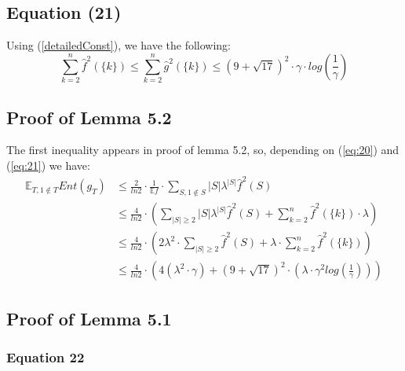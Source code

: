 \documentclass{article}
\begin{document}
		\subsection{Equation (21)}
			Using (\ref{detailedConst}), we have the following:
			\begin{equation} \label{eq:21}
				\sum_{k=2}^n \hat{f}^2 \left( \{k\} \right) 
				\leq \sum_{k=2}^n \hat{g}^2 \left( \{k\} \right) 
				\leq \left( 9 + \sqrt{17} \right) ^ 2 \cdot \gamma \cdot log \left( \frac{1}{\gamma} \right)
			\end{equation}
	
		\subsection{Proof of Lemma 5.2}
			The first inequality appears in proof of lemma 5.2, so, depending on (\ref{eq:20}) and (\ref{eq:21}) we have:
			\begin{equation} \label{lemma5:2}\begin{aligned}
				\mathbb{E}_{T, 1 \notin T} Ent(g_T)
				& \leq \frac{2}{ln2} \cdot \frac{1}{\mathbb{E} f} \cdot \sum_{S, 1 \notin S} |S| \lambda^{|S|} \hat{f}^2(S) \\
				& \leq \frac{4}{ln2} \cdot \left( \sum_{|S| \geq 2} |S| \lambda^{|S|} \hat{f}^2(S) + \sum_{k=2}^n \hat{f}^2 \left( \{k\} \right) \cdot \lambda \right) \\
				& \leq \frac{4}{ln2}  \cdot \left( 2 \lambda^2 \cdot \sum_{|S| \geq 2} \hat{f}^2(S) + \lambda \cdot \sum_{k=2}^n \hat{f}^2 \left( \{k\} \right) \right) \\
				& \leq \frac{4}{ln2} \cdot \left( 4 ( \lambda^2 \cdot \gamma ) + \left( 9 + \sqrt{17} \right)^2 \cdot \left( \lambda \cdot \gamma^2 log \left( \frac{1}{\gamma} \right) \right) \right)
			\end{aligned}
			\end{equation}
		

		\subsection{Proof of Lemma 5.1}
			\subsubsection{Equation 22}
			
\end{document}
